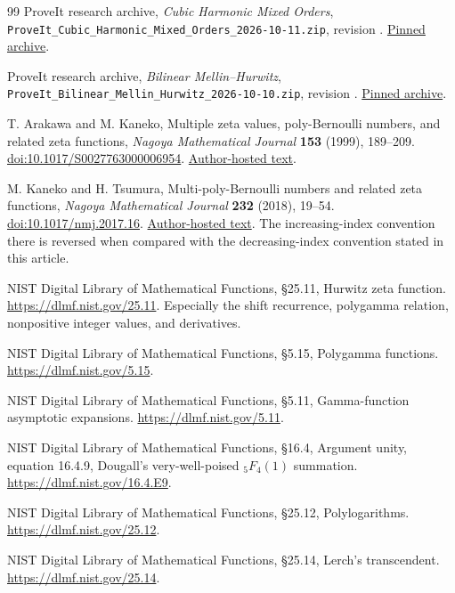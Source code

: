 \documentclass[11pt,a4paper]{article}
\numberwithin{equation}{section}
\theoremstyle{definition}
\theoremstyle{remark}
\newcommand{\src}[1]{\texttt{\detokenize{#1}}}
\begin{document}
\begin{thebibliography}{99}
ProveIt research archive,
\emph{Cubic Harmonic Mixed Orders},
\nolinkurl{ProveIt_Cubic_Harmonic_Mixed_Orders_2026-10-11.zip},
revision \src{921b58f10995}.
\href{https://github.com/VladimirReshetnikov/ProveIt/blob/921b58f1099568bfefa28a556470e4b29e94eb3b/docs/incoming/ProveIt_Cubic_Harmonic_Mixed_Orders_2026-10-11.zip}{Pinned archive}.

ProveIt research archive,
\emph{Bilinear Mellin--Hurwitz},
\nolinkurl{ProveIt_Bilinear_Mellin_Hurwitz_2026-10-10.zip},
revision \src{921b58f10995}.
\href{https://github.com/VladimirReshetnikov/ProveIt/blob/921b58f1099568bfefa28a556470e4b29e94eb3b/docs/incoming/ProveIt_Bilinear_Mellin_Hurwitz_2026-10-10.zip}{Pinned archive}.

T. Arakawa and M. Kaneko,
Multiple zeta values, poly-Bernoulli numbers, and related zeta functions,
\emph{Nagoya Mathematical Journal} \textbf{153} (1999), 189--209.
\href{https://doi.org/10.1017/S0027763000006954}{doi:10.1017/S0027763000006954}.
\href{https://www2.math.kyushu-u.ac.jp/~mkaneko/papers/18MZV_pB_Nagoya.pdf}{Author-hosted text}.

M. Kaneko and H. Tsumura,
Multi-poly-Bernoulli numbers and related zeta functions,
\emph{Nagoya Mathematical Journal} \textbf{232} (2018), 19--54.
\href{https://doi.org/10.1017/nmj.2017.16}{doi:10.1017/nmj.2017.16}.
\href{https://www2.math.kyushu-u.ac.jp/~mkaneko/papers/56Kaneko_Tsumura.pdf}{Author-hosted text}.
The increasing-index convention there is reversed when compared with
the decreasing-index convention stated in this article.

NIST Digital Library of Mathematical Functions,
\S25.11, Hurwitz zeta function.
\url{https://dlmf.nist.gov/25.11}.
Especially the shift recurrence, polygamma relation,
nonpositive integer values, and derivatives.

NIST Digital Library of Mathematical Functions,
\S5.15, Polygamma functions.
\url{https://dlmf.nist.gov/5.15}.

NIST Digital Library of Mathematical Functions,
\S5.11, Gamma-function asymptotic expansions.
\url{https://dlmf.nist.gov/5.11}.

NIST Digital Library of Mathematical Functions,
\S16.4, Argument unity, equation 16.4.9,
Dougall's very-well-poised ${}_5F_4(1)$ summation.
\url{https://dlmf.nist.gov/16.4.E9}.

NIST Digital Library of Mathematical Functions,
\S25.12, Polylogarithms.
\url{https://dlmf.nist.gov/25.12}.

NIST Digital Library of Mathematical Functions,
\S25.14, Lerch's transcendent.
\url{https://dlmf.nist.gov/25.14}.

\end{thebibliography}

\end{document}
